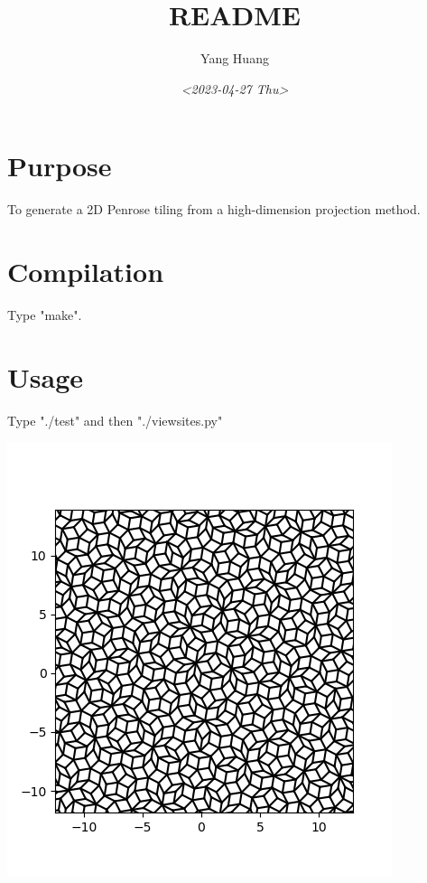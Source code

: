 \documentclass[11pt]{article}
\author{Yang Huang}
\date{\textit{<2023-04-27 Thu>}}
\title{README}
\begin{document}
\maketitle
\tableofcontents


\section{Purpose}
\label{sec:org129e5e0}
To generate a 2D Penrose tiling  from a high-dimension projection
method.

\section{Compilation}
\label{sec:org4e0e7ea}
Type "make".

\section{Usage}
\label{sec:org16455bc}
Type "./test" and then "./viewsites.py"

\begin{center}
\includegraphics[width=.9\linewidth]{./qcs.png}
\end{center}
\end{document}
